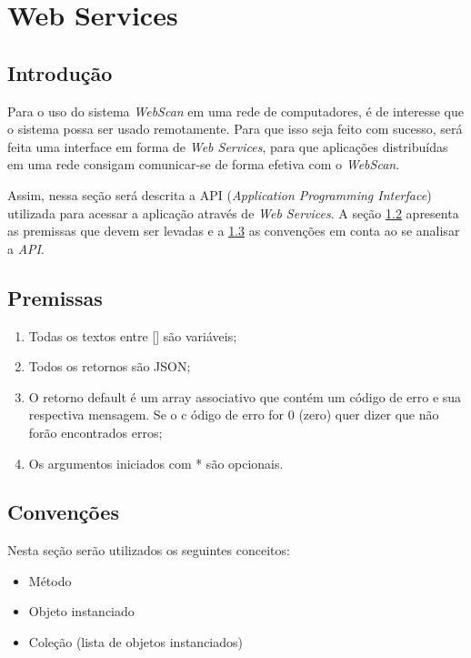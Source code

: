 
\section{Web Services}
\label{sec:web_services}

\subsection{Introdução}
Para o uso do sistema {\it WebScan} em uma rede de computadores, é de interesse que o sistema possa ser usado remotamente. Para que isso seja feito com sucesso, será feita uma interface em forma de {\it Web Services}, para que aplicações distribuídas em uma rede consigam comunicar-se de forma efetiva com o {\it WebScan}.

Assim, nessa seção será descrita a API ({\it Application Programming Interface}) utilizada para acessar a aplicação através de {\it Web Services}. A seção \ref{sec:premissas} apresenta as 
premissas que devem ser levadas e a \ref{sec:convencoes} as convenções em conta ao se analisar a {\it API}.  

 
\subsection{Premissas}
\label{sec:premissas}

\begin{enumerate}
    \item Todas os textos entre [] são variáveis; 
    \item Todos os retornos são JSON;
    \item O retorno default é um array associativo que contém um código de 
            erro e sua respectiva mensagem. Se o c ódigo de erro for 0 (zero)
            quer dizer que não forão encontrados erros;
    \item Os argumentos iniciados com * são opcionais.
\end{enumerate}
 
\subsection{Convenções}
\label{sec:convencoes}

Nesta seção serão utilizados os seguintes conceitos:

\begin{itemize}
    \item Método 
    \item Objeto instanciado
    \item Coleção (lista de objetos instanciados)
\end{itemize}

